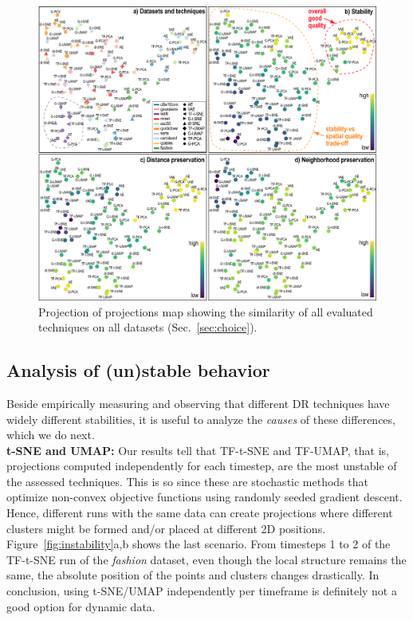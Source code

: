 \begin{figure}[!tb]
\centering
\includegraphics[width=\linewidth]{figures/projection-evaluation/summary_plots.eps}
\caption{Projection of projections map showing the similarity of all evaluated techniques on all datasets (Sec.~\ref{sec:choice}).}
\label{fig:tsne_0}
\vspace{-0.15cm}
\end{figure}


\subsection{Analysis of (un)stable behavior}
\label{sec:unstable}
%
Beside empirically measuring and observing that different DR techniques have widely different stabilities, it is useful to analyze the \emph{causes} of these differences, which we do next.\\

\noindent\textbf{t-SNE and UMAP:} Our results tell that TF-t-SNE and TF-UMAP, that is, projections computed independently for each timestep, are the most unstable of the assessed techniques.
This is so since these are stochastic methods that optimize non-convex objective functions using randomly seeded gradient descent. Hence, different runs with the same data can create projections where different clusters might be formed and/or placed at different 2D positions. Figure~\ref{fig:instability}a,b shows the last scenario. From timesteps 1 to 2 of the TF-t-SNE run of the \textit{fashion} dataset, even though the local structure remains the same, the absolute position of the points and clusters changes drastically. In conclusion, using t-SNE/UMAP independently per timeframe is definitely not a good option for dynamic data.\\

